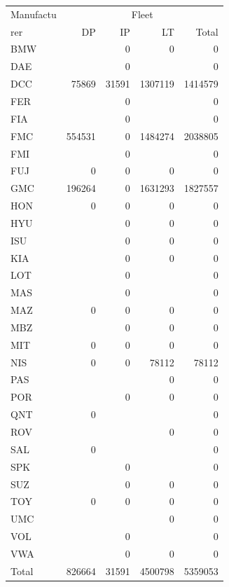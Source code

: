 \begin{tabular}{lrrrr}
\toprule
Manufactu & \multicolumn{4}{c}{Fleet} \\
rer & DP & IP & LT & Total \\
\midrule
BMW &  & 0 & 0 & 0 \\
DAE &  & 0 &  & 0 \\
DCC & 75869 & 31591 & 1307119 & 1414579 \\
FER &  & 0 &  & 0 \\
FIA &  & 0 &  & 0 \\
FMC & 554531 & 0 & 1484274 & 2038805 \\
FMI &  & 0 &  & 0 \\
FUJ & 0 & 0 & 0 & 0 \\
GMC & 196264 & 0 & 1631293 & 1827557 \\
HON & 0 & 0 & 0 & 0 \\
HYU &  & 0 & 0 & 0 \\
ISU &  & 0 & 0 & 0 \\
KIA &  & 0 & 0 & 0 \\
LOT &  & 0 &  & 0 \\
MAS &  & 0 &  & 0 \\
MAZ & 0 & 0 & 0 & 0 \\
MBZ &  & 0 & 0 & 0 \\
MIT & 0 & 0 & 0 & 0 \\
NIS & 0 & 0 & 78112 & 78112 \\
PAS &  &  & 0 & 0 \\
POR &  & 0 & 0 & 0 \\
QNT & 0 &  &  & 0 \\
ROV &  &  & 0 & 0 \\
SAL & 0 &  &  & 0 \\
SPK &  & 0 &  & 0 \\
SUZ &  & 0 & 0 & 0 \\
TOY & 0 & 0 & 0 & 0 \\
UMC &  &  & 0 & 0 \\
VOL &  & 0 &  & 0 \\
VWA &  & 0 & 0 & 0 \\
Total & 826664 & 31591 & 4500798 & 5359053 \\
\bottomrule
\end{tabular}

